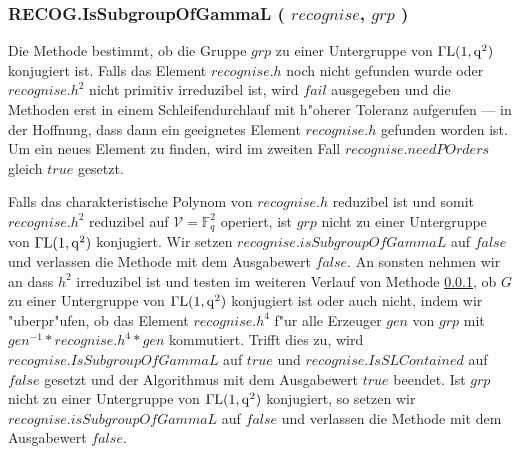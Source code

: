 \documentclass[a4paper,11pt]{article}
\theoremstyle{bla}
\begin{document}

\subsubsection{RECOG.IsSubgroupOfGammaL ( $recognise$, $grp$ )}\label{gamma}

 Die Methode bestimmt, ob die Gruppe $grp$ zu einer Untergruppe von $\Gamma\rm{L}(1,q^2)$ konjugiert ist. Falls das Element $recognise.h$ noch nicht gefunden wurde oder $recognise.h^2$ nicht primitiv irreduzibel ist, wird $fail$ ausgegeben und die Methoden erst in einem Schleifendurchlauf mit h"oherer Toleranz aufgerufen --- in der Hoffnung, dass dann ein geeignetes Element $recognise.h$ gefunden worden ist. Um ein neues Element zu finden, wird im zweiten Fall $recognise.needPOrders$ gleich $true$ gesetzt.

 Falls das charakteristische Polynom von $recognise.h$ reduzibel ist und somit $recognise.h^2$ reduzibel auf $\mathcal{V} = \mathbb{F}_{q}^2$ operiert, ist $grp$ nicht zu einer Untergruppe von $\Gamma\rm{L}(1,q^2)$ konjugiert. Wir setzen $recognise.isSubgroupOfGammaL$ auf $false$ und verlassen die Methode mit dem Ausgabewert $false$. An sonsten nehmen wir an dass $h^2$ irreduzibel ist und testen im weiteren Verlauf von Methode \ref{gamma}, ob $G$ zu einer Untergruppe von $\Gamma\rm{L}(1,q^2)$ konjugiert ist oder auch nicht, indem wir "uberpr"ufen, ob das Element $recognise.h^4$ f"ur alle Erzeuger $gen$ von $grp$ mit $gen^{-1} * recognise.h^4 * gen$ kommutiert. Trifft dies zu, wird $recognise.IsSubgroupOfGammaL$ auf $true$ und $recognise.IsSLContained$ auf $false$ gesetzt und der Algorithmus mit dem Ausgabewert $true$ beendet. Ist $grp$ nicht zu einer Untergruppe von $\Gamma\rm{L}(1,q^2)$ konjugiert, so setzen wir $recognise.isSubgroupOfGammaL$ auf $false$ und verlassen die Methode mit dem Ausgabewert $false$.
\end{document}

